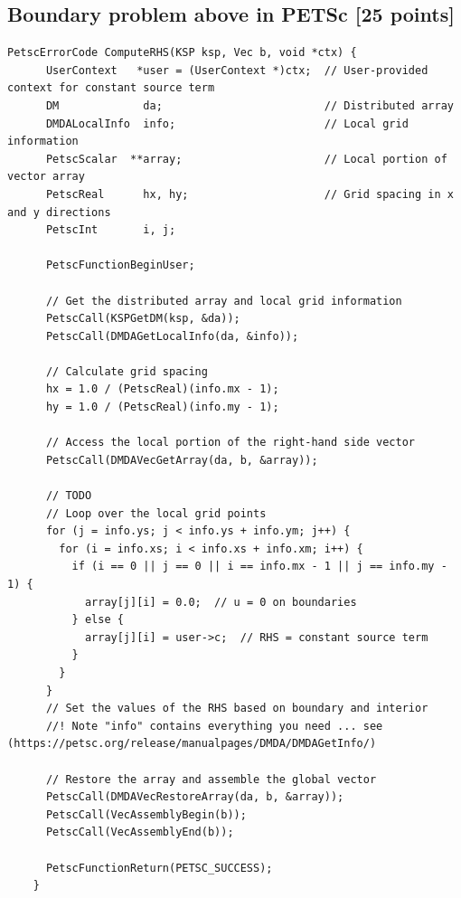 \documentclass[unicode,11pt,a4paper,oneside,numbers=endperiod,openany]{scrartcl}
\begin{document}
\subsection{Boundary problem above in PETSc [25 points]}
\begin{lstlisting}[language=MyC++, style=mystyle, caption={ComputeRHS function in PETSc C++ code}]
	PetscErrorCode ComputeRHS(KSP ksp, Vec b, void *ctx) {
	  UserContext   *user = (UserContext *)ctx;  // User-provided context for constant source term
	  DM             da;                         // Distributed array
	  DMDALocalInfo  info;                       // Local grid information
	  PetscScalar  **array;                      // Local portion of vector array
	  PetscReal      hx, hy;                     // Grid spacing in x and y directions
	  PetscInt       i, j;
	
	  PetscFunctionBeginUser;
	
	  // Get the distributed array and local grid information
	  PetscCall(KSPGetDM(ksp, &da));
	  PetscCall(DMDAGetLocalInfo(da, &info));
	
	  // Calculate grid spacing
	  hx = 1.0 / (PetscReal)(info.mx - 1);
	  hy = 1.0 / (PetscReal)(info.my - 1); 
	
	  // Access the local portion of the right-hand side vector
	  PetscCall(DMDAVecGetArray(da, b, &array));
	
	  // TODO 
	  // Loop over the local grid points
	  for (j = info.ys; j < info.ys + info.ym; j++) {
		for (i = info.xs; i < info.xs + info.xm; i++) {
		  if (i == 0 || j == 0 || i == info.mx - 1 || j == info.my - 1) {
			array[j][i] = 0.0;  // u = 0 on boundaries
		  } else {
			array[j][i] = user->c;  // RHS = constant source term
		  }
		}
	  }
	  // Set the values of the RHS based on boundary and interior
	  //! Note "info" contains everything you need ... see (https://petsc.org/release/manualpages/DMDA/DMDAGetInfo/)
	
	  // Restore the array and assemble the global vector
	  PetscCall(DMDAVecRestoreArray(da, b, &array));
	  PetscCall(VecAssemblyBegin(b));
	  PetscCall(VecAssemblyEnd(b));
	
	  PetscFunctionReturn(PETSC_SUCCESS);
	}
\end{lstlisting}
\end{document}
